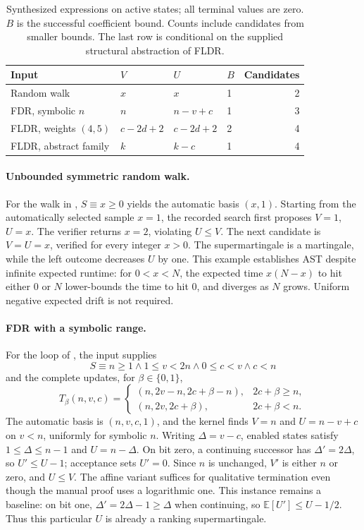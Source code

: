 \begin{table}[t]
\centering
\small
\setlength{\tabcolsep}{4pt}
\begin{tabular}{@{}llllr@{}}
\toprule
Input & $V$ & $U$ & $B$ & Candidates\\
\midrule
Random walk & $x$ & $x$ & 1 & 2\\
FDR, symbolic $n$ & $n$ & $n-v+c$ & 1 & 3\\
FLDR, weights $(4,5)$ & $c-2d+2$ & $c-2d+2$ & 2 & 4\\
FLDR, abstract family & $k$ & $k-c$ & 1 & 4\\
\bottomrule
\end{tabular}
\caption{Synthesized expressions on active states; all terminal values are
zero. $B$ is the successful coefficient bound. Counts include candidates
from smaller bounds. The last row is conditional on the supplied
structural abstraction of FLDR.}
\label{tab:synthesis-results}
\end{table}

\paragraph{Unbounded symmetric random walk.}
For the walk in , $S\equiv x\geq0$ yields the automatic
basis $(x,1)$. Starting from the automatically selected sample $x=1$,
the recorded search first proposes $V=1$, $U=x$. The verifier returns
$x=2$, violating $U\leq V$. The next candidate is $V=U=x$, verified
for every integer $x>0$. The supermartingale is a martingale, while the
left outcome decreases $U$ by one. This example establishes AST despite
infinite expected runtime: for $0<x<N$, the expected time $x(N-x)$ to
hit either $0$ or $N$ lower-bounds the time to hit $0$, and diverges as
$N$ grows. Uniform negative expected drift is not required.

\paragraph{FDR with a symbolic range.}
For the loop of , the input supplies
\[
 S\equiv n\geq1\land1\leq v<2n\land0\leq c<v\land c<n
\]
and the complete updates, for $\beta\in\{0,1\}$,
\[
 T_\beta(n,v,c)=
 \begin{cases}
 (n,2v-n,2c+\beta-n),&2c+\beta\geq n,\\
 (n,2v,2c+\beta),&2c+\beta<n.
 \end{cases}
\]
The automatic basis is $(n,v,c,1)$, and the kernel finds $V=n$ and
$U=n-v+c$ on $v<n$, uniformly for symbolic $n$. Writing
$\Delta=v-c$, enabled states satisfy $1\leq\Delta\leq n-1$ and
$U=n-\Delta$. On bit zero, a continuing successor has
$\Delta'=2\Delta$, so $U'\leq U-1$; acceptance sets $U'=0$.
Since $n$ is unchanged, $V'$ is either $n$ or zero, and $U\leq V$.
The affine variant suffices for qualitative termination even though the
manual proof uses a logarithmic one. This instance remains a baseline:
on bit one, $\Delta'=2\Delta-1\geq\Delta$ when continuing, so
$\mathbb{E}[U']\leq U-1/2$. Thus this particular $U$ is already a
ranking supermartingale.

